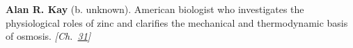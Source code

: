\textbf{Alan R. Kay} (b. unknown). American biologist who investigates the physiological roles of zinc and clarifies the mechanical and thermodynamic basis of osmosis. \emph{[Ch.~\hyperref[ch:osmosisdebye]{31}]}

